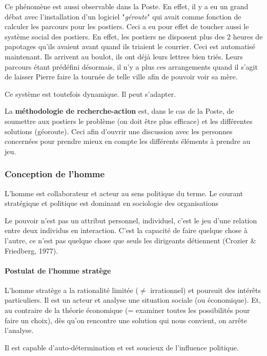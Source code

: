 \documentclass[12pt]{article}
\begin{document}
	Ce phénomène est aussi observable dans la Poste. En effet, il y a eu un grand débat avec l'installation d'un logiciel "\textit{géroute}" qui avait comme fonction de calculer les parcours pour les postiers. Ceci a eu pour effet de toucher aussi le système social des postiers. En effet, les postiers ne disposent plus des 2 heures de papotages qu'ils avaient avant quand ils triaient le courrier. Ceci est automatisé maintenant. Ils arrivent au boulot, ils ont déjà leurs lettres bien triés. Leurs parcours étant prédéfini désormais, il n'y a plus ces arrangements quand il s'agit de laisser Pierre faire la tournée de telle ville afin de pouvoir voir sa mère. \newline
	
	Ce système est toutefois dynamique. Il peut s'adapter.\newline
	
	La \textbf{méthodologie de recherche-action} est, dans le cas de la Poste, de soumettre aux postiers le problème (on doit être plus efficace) et les différentes solutions (géoroute). Ceci afin d'ouvrir une discussion avec les personnes concernées pour prendre mieux en compte les différents éléments à prendre au jeu. 
	
	
	\subsubsection{Conception de l'homme}
	L'homme est collaborateur et acteur au sens politique du terme. Le courant stratégique et politique est dominant en sociologie des organisations
	
	Le pouvoir n'est pas un attribut personnel, individuel, c'est le jeu d'une relation entre deux individus en interaction. C'est la capacité de faire quelque chose à l'autre, ce n'est pas quelque chose que seuls les dirigeants détiennent (Crozier \& Friedberg, 1977).
	
	\paragraph{Postulat de l'homme stratège} L'homme stratège a la rationalité limitée ($\neq$ irrationnel) et poursuit des intérêts particuliers. Il est un acteur et analyse une situation sociale (ou économique). Et, au contraire de la théorie économique (= examiner toutes les possibilités pour faire un choix), dès qu'on rencontre une \og{} solution\fg{} qui nous convient, on arrête l'analyse.
	
	Il est capable d'auto-détermination et est soucieux de l'influence politique.
	
\end{document}
